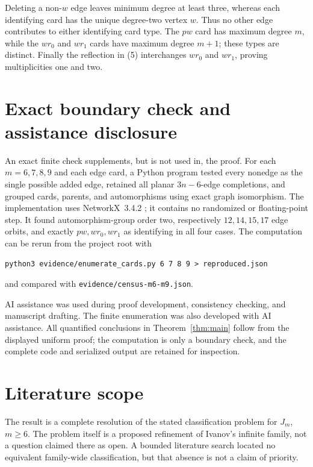 \documentclass[11pt]{article}
\begin{document}
Deleting a non-$w$ edge leaves minimum degree at least three, whereas each
identifying card has the unique degree-two vertex $w$.  Thus no other edge
contributes to either identifying card type.  The $pw$ card has maximum
degree $m$, while the $wr_0$ and $wr_1$ cards have maximum degree $m+1$;
these types are distinct.  Finally the reflection in (5) interchanges
$wr_0$ and $wr_1$, proving multiplicities one and two.

\section{Exact boundary check and assistance disclosure}

An exact finite check supplements, but is not used in, the proof.  For
each $m=6,7,8,9$ and each edge card, a Python program tested every nonedge
as the single possible added edge, retained all planar $3n-6$-edge
completions, and grouped cards, parents, and automorphisms using exact graph
isomorphism.  The implementation uses NetworkX~3.4.2
\cite{HagbergSchultSwart2008}; it contains no randomized or floating-point
step.  It found automorphism-group order two, respectively $12,14,15,17$
edge orbits, and exactly $pw,wr_0,wr_1$ as identifying in all four cases.
The computation can be rerun from the project root with
\begin{verbatim}
python3 evidence/enumerate_cards.py 6 7 8 9 > reproduced.json
\end{verbatim}
and compared with \texttt{evidence/census-m6-m9.json}.

AI assistance was used during proof development, consistency checking, and
manuscript drafting.  The finite enumeration was also developed with AI
assistance.  All quantified conclusions in Theorem~\ref{thm:main} follow
from the displayed uniform proof; the computation is only a boundary
check, and the complete code and serialized output are retained for
inspection.

\section{Literature scope}

The result is a complete resolution of the stated classification problem
for $J_m$, $m\geq6$.  The problem itself is a proposed refinement of
Ivanov's infinite family, not a question claimed there as open.  A bounded
literature search located no equivalent family-wide classification, but
that absence is not a claim of priority.



\end{document}
